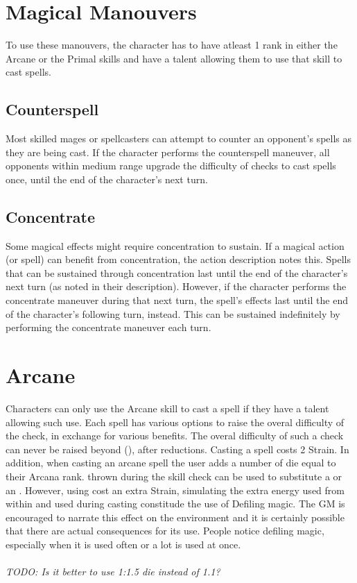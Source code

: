 \begin{multicols}{2}

\section{Magical Manouvers}
To use these manouvers, the character has to have atleast 1 rank in either
the Arcane or the Primal skills and have a talent allowing them to use that
skill to cast spells.

\subsection{Counterspell}
Most skilled mages or spellcasters can attempt to counter an opponent’s spells
as they are being cast. If the character performs the counterspell maneuver,
all opponents within medium range upgrade the difficulty of checks to cast
spells once, until the end of the character's next turn.

\subsection{Concentrate}
Some magical effects might require concentration to sustain. If a magical action
(or spell) can benefit from concentration, the action description notes this.
Spells that can be sustained through concentration last until the end of the
character's next turn (as noted in their description). However, if the character
performs the concentrate maneuver during that next turn, the spell’s effects last
until the end of the character’s following turn, instead. This can be sustained
indefinitely by performing the concentrate maneuver each turn.

\section{Arcane}
Characters can only use the Arcane skill to cast a spell if they have a talent
allowing such use. Each spell has various options to raise the overal difficulty
of the check, in exchange for various benefits. The overal difficulty of
such a check can never be raised beyond (\difficulty\difficulty\difficulty\difficulty\difficulty),
after reductions. Casting a spell costs 2 Strain. In addition, when casting an
arcane spell the user adds a number of \force die equal to their Arcana rank.
\darklight thrown during the skill check can be used to substitute a \success or
an \advantage. However, using \light cost an extra Strain, simulating the
extra energy used from within and \dark used during casting constitude the use
of Defiling magic. The GM is encouraged to narrate this effect on the environment
and it is certainly possible that there are actual consequences for its use. People
notice defiling magic, especially when it is used often or a lot \darklight is used at
once.\\
\\
\textit{TODO: Is it better to use 1:1.5 \force die instead of 1.1?}

\end{multicols}
